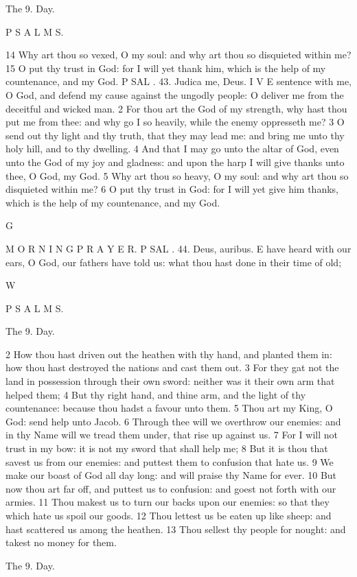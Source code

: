 The 9. Day.

P S A L M S.

14 Why art thou so vexed, O my soul: and why art thou so disquieted within me? 15 O put thy trust in God: for I will yet thank him, which is the help of my countenance, and my God. P SAL . 43. Judica me, Deus. I V E sentence with me, O God, and defend my cause against the ungodly people: O deliver me from the deceitful and wicked man. 2 For thou art the God of my strength, why hast thou put me from thee: and why go I so heavily, while the enemy oppresseth me? 3 O send out thy light and thy truth, that they may lead me: and bring me unto thy holy hill, and to thy dwelling. 4 And that I may go unto the altar of God, even unto the God of my joy and gladness: and upon the harp I will give thanks unto thee, O God, my God. 5 Why art thou so heavy, O my soul: and why art thou so disquieted within me? 6 O put thy trust in God: for I will yet give him thanks, which is the help of my countenance, and my God.

G

M O R N I N G P R A Y E R. P SAL . 44. Deus, auribus. E have heard with our ears, O God, our fathers have told us: what thou hast done in their time of old;

W

P S A L M S.

The 9. Day.

2 How thou hast driven out the heathen with thy hand, and planted them in: how thou hast destroyed the nations and cast them out. 3 For they gat not the land in possession through their own sword: neither was it their own arm that helped them; 4 But thy right hand, and thine arm, and the light of thy countenance: because thou hadst a favour unto them. 5 Thou art my King, O God: send help unto Jacob. 6 Through thee will we overthrow our enemies: and in thy Name will we tread them under, that rise up against us. 7 For I will not trust in my bow: it is not my sword that shall help me; 8 But it is thou that savest us from our enemies: and puttest them to confusion that hate us. 9 We make our boast of God all day long: and will praise thy Name for ever. 10 But now thou art far off, and puttest us to confusion: and goest not forth with our armies. 11 Thou makest us to turn our backs upon our enemies: so that they which hate us spoil our goods. 12 Thou lettest us be eaten up like sheep: and hast scattered us among the heathen. 13 Thou sellest thy people for nought: and takest no money for them.

The 9. Day.

